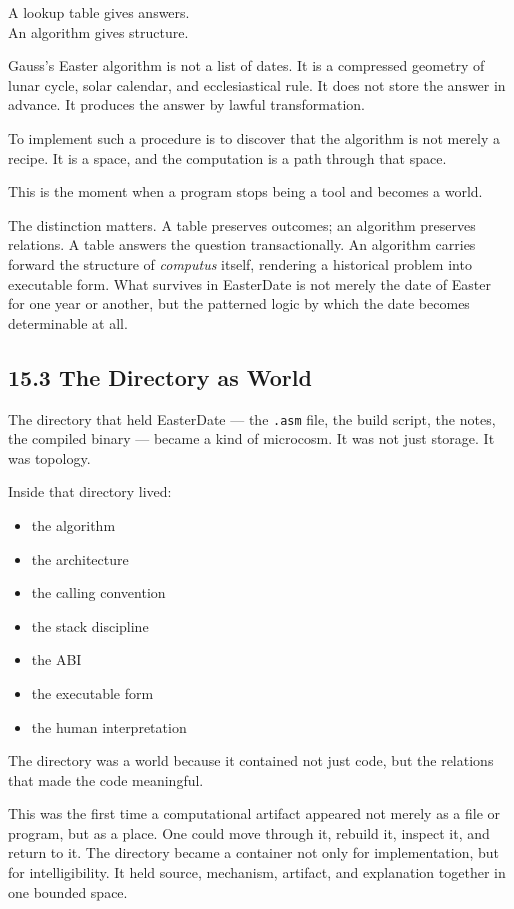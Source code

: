 \documentclass[
]{article}
\providecommand{\tightlist}{%
  \setlength{\itemsep}{0pt}\setlength{\parskip}{0pt}}
\begin{document}
A lookup table gives answers.\\
An algorithm gives structure.

Gauss's Easter algorithm is not a list of dates. It is a compressed
geometry of lunar cycle, solar calendar, and ecclesiastical rule. It
does not store the answer in advance. It produces the answer by lawful
transformation.

To implement such a procedure is to discover that the algorithm is not
merely a recipe. It is a space, and the computation is a path through
that space.

This is the moment when a program stops being a tool and becomes a
world.

The distinction matters. A table preserves outcomes; an algorithm
preserves relations. A table answers the question transactionally. An
algorithm carries forward the structure of \emph{computus} itself,
rendering a historical problem into executable form. What survives in
EasterDate is not merely the date of Easter for one year or another, but
the patterned logic by which the date becomes determinable at all.

\hypertarget{the-directory-as-world}{%
\subsection{15.3 The Directory as World}\label{the-directory-as-world}}

The directory that held EasterDate --- the \texttt{.asm} file, the build
script, the notes, the compiled binary --- became a kind of microcosm.
It was not just storage. It was topology.

Inside that directory lived:

\begin{itemize}
\tightlist
\item
  the algorithm
\item
  the architecture
\item
  the calling convention
\item
  the stack discipline
\item
  the ABI
\item
  the executable form
\item
  the human interpretation
\end{itemize}

The directory was a world because it contained not just code, but the
relations that made the code meaningful.

This was the first time a computational artifact appeared not merely as
a file or program, but as a place. One could move through it, rebuild
it, inspect it, and return to it. The directory became a container not
only for implementation, but for intelligibility. It held source,
mechanism, artifact, and explanation together in one bounded space.
\end{document}
